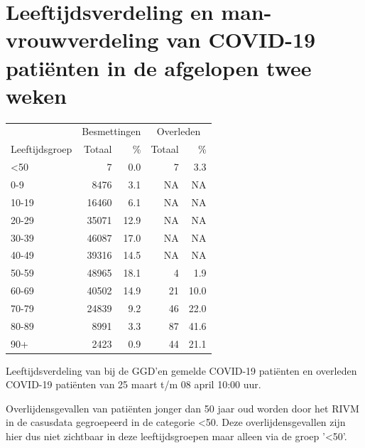\documentclass[
  english,
  man,floatsintext]{apa6}
\begin{document}
\newpage

\hypertarget{leeftijdsverdeling-en-man-vrouwverdeling-van-covid-19-patiuxebnten-in-de-afgelopen-twee-weken}{%
\section{Leeftijdsverdeling en man-vrouwverdeling van COVID-19 patiënten in de afgelopen twee weken}\label{leeftijdsverdeling-en-man-vrouwverdeling-van-covid-19-patiuxebnten-in-de-afgelopen-twee-weken}}

\begin{table}
\centering\begingroup\fontsize{11}{13}\selectfont

\begin{threeparttable}
\begin{tabular}{lrrrr}
\toprule
\multicolumn{1}{c}{ } & \multicolumn{2}{c}{Besmettingen} & \multicolumn{2}{c}{Overleden} \\
\cmidrule(l{3pt}r{3pt}){2-3} \cmidrule(l{3pt}r{3pt}){4-5}
Leeftijdsgroep & Totaal & \% & Totaal & \%\\
\midrule
<50 & 7 & 0.0 & 7 & 3.3\\
0-9 & 8476 & 3.1 & NA & NA\\
10-19 & 16460 & 6.1 & NA & NA\\
20-29 & 35071 & 12.9 & NA & NA\\
30-39 & 46087 & 17.0 & NA & NA\\
40-49 & 39316 & 14.5 & NA & NA\\
50-59 & 48965 & 18.1 & 4 & 1.9\\
60-69 & 40502 & 14.9 & 21 & 10.0\\
70-79 & 24839 & 9.2 & 46 & 22.0\\
80-89 & 8991 & 3.3 & 87 & 41.6\\
90+ & 2423 & 0.9 & 44 & 21.1\\
\bottomrule
\end{tabular}
\begin{tablenotes}
\item[1] Leeftijdsverdeling van bij de GGD’en gemelde COVID-19 patiënten en overleden COVID-19 patiënten van 25 maart t/m 08 april 10:00 uur.
\item[2] Overlijdensgevallen van patiënten jonger dan 50 jaar oud worden door het RIVM in de casusdata gegroepeerd in de categorie <50. Deze overlijdensgevallen zijn hier dus niet zichtbaar in deze leeftijdsgroepen maar alleen via de groep '<50'.
\end{tablenotes}
\end{threeparttable}
\endgroup{}
\end{table}
\end{document}
